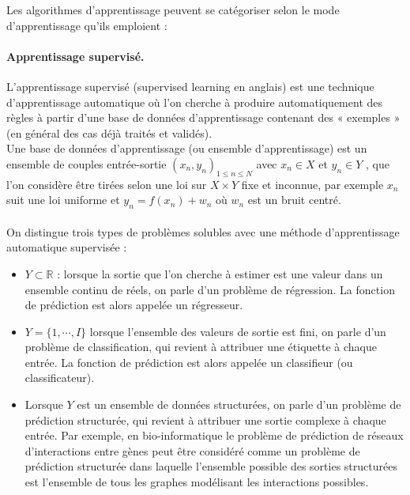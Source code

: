 \documentclass[12pt, french]{article}
\begin{document}
Les algorithmes d'apprentissage peuvent se catégoriser selon le mode d'apprentissage qu'ils emploient :

\paragraph{Apprentissage supervisé. }

L'apprentissage supervisé (supervised learning en anglais) est une technique d'apprentissage automatique où l'on cherche à produire automatiquement des règles à partir d'une base de données d'apprentissage contenant des « exemples » (en général des cas déjà traités et validés).\\
Une base de données d'apprentissage (ou ensemble d'apprentissage) est un ensemble de couples entrée-sortie $(x_n, y_n)_{1 \leq n \leq N}$ avec $x_n \in X$ et $y_n \in Y $  , que l'on considère être tirées selon une loi sur $ X \times Y $ fixe et inconnue, par exemple $x_n$ suit une loi uniforme et $ y_n = f(x_n) + w_n$ où $w_n$ est un bruit centré. \\\\
On distingue trois types de problèmes solubles avec une méthode d'apprentissage automatique supervisée :  

\begin{itemize} 
\item $Y \subset \mathbb{R}$  : lorsque la sortie que l'on cherche à estimer est une valeur dans un ensemble continu de réels, on parle d'un problème de régression. La fonction de prédiction est alors appelée un régresseur.
\item $Y = \{ 1, \cdots, I \} $ lorsque l'ensemble des valeurs de sortie est fini, on parle d'un problème de classification, qui revient à attribuer une étiquette à chaque entrée. La fonction de prédiction est alors appelée un classifieur (ou classificateur).
\item Lorsque  $Y$ est un ensemble de données structurées, on parle d'un problème de prédiction structurée, qui revient à attribuer une sortie complexe à chaque entrée. Par exemple, en bio-informatique le problème de prédiction de réseaux d’interactions entre gènes peut être considéré comme un problème de prédiction structurée dans laquelle l'ensemble possible des sorties structurées est l'ensemble de tous les graphes modélisant les interactions possibles.
\end{itemize}
\end{document}
